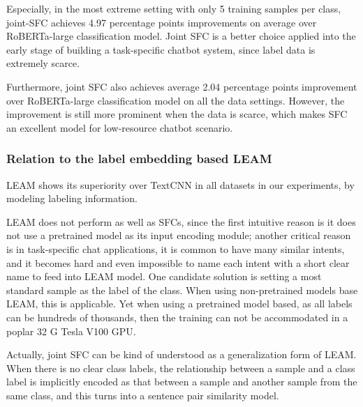 Especially, in the most extreme setting with only 5 training samples per class, joint-SFC achieves 4.97 percentage points improvements on average over RoBERTa-large classification model. 
Joint SFC is a better choice applied into the early stage of building a task-specific chatbot system, since label data is extremely scarce.

Furthermore, joint SFC also achieves average 2.04 percentage points improvement over RoBERTa-large classification model on all the data settings. 
However, the improvement is still more prominent when the data is scarce, which makes SFC an excellent model for low-resource chatbot scenario.

\subsubsection*{Relation to the label embedding based LEAM}
LEAM shows its superiority over TextCNN in all datasets in our experiments, by modeling labeling information.

LEAM does not perform as well as SFCs, since the first intuitive reason is it does not use a pretrained model as its input encoding module; 
another critical reason is in task-specific chat applications, it is common to have many similar intents, and it becomes hard and even impossible to name each intent with a short clear name to feed into LEAM model.
One candidate solution is setting a most standard sample as the label of the class. 
When using non-pretrained models base LEAM, this is applicable. 
Yet when using a pretrained model based, as all labels can be hundreds of thousands, then the training can not be accommodated in a poplar 32 G Tesla V100 GPU. 

Actually, joint SFC can be kind of understood as a generalization form of LEAM. 
When there is no clear class labels, the relationship between a sample and a class label is implicitly encoded as that between a sample and another sample from the same class, and this turns into a sentence pair similarity model.  

